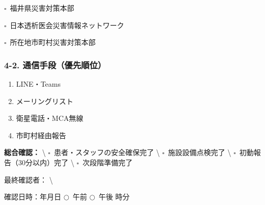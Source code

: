 \documentclass[
  japanese,
]{jarticle}
\newcommand{\checkbox}{$\square$\ }
\newcommand{\underlinespace}[1]{\underline{\hspace{#1}}}
\newcommand{\circlecheck}{$\bigcirc$\ }
\begin{document}
\checkbox 福井県災害対策本部

\checkbox 日本透析医会災害情報ネットワーク

\checkbox 所在地市町村災害対策本部

\subsubsection{4-2.
通信手段（優先順位）}\label{ux901aux4fe1ux624bux6bb5ux512aux5148ux9806ux4f4d}

\begin{enumerate}
\def\labelenumi{\arabic{enumi}.}
\item
  LINE・Teams
\item
  メーリングリスト
\item
  衛星電話・MCA無線
\item
  市町村経由報告
\end{enumerate}

\textbf{総合確認：} \textbackslash{}
\checkbox 患者・スタッフの安全確保完了 \textbackslash{}
\checkbox 施設設備点検完了 \textbackslash{}
\checkbox 初動報告（30分以内）完了 \textbackslash{}
\checkbox 次段階準備完了

最終確認者：\underlinespace{4cm} \textbackslash{}

確認日時：\underlinespace{2cm}年\underlinespace{1cm}月\underlinespace{1cm}日
\circlecheck 午前 \circlecheck 午後
\underlinespace{1cm}時\underlinespace{1cm}分
\end{document}
